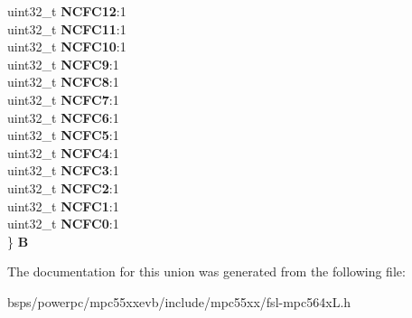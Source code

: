 \begin{DoxyCompactItemize}
\begin{tabbing}
\>uint32\_t {\bfseries NCFC12}:1\\
\>uint32\_t {\bfseries NCFC11}:1\\
\>uint32\_t {\bfseries NCFC10}:1\\
\>uint32\_t {\bfseries NCFC9}:1\\
\>uint32\_t {\bfseries NCFC8}:1\\
\>uint32\_t {\bfseries NCFC7}:1\\
\>uint32\_t {\bfseries NCFC6}:1\\
\>uint32\_t {\bfseries NCFC5}:1\\
\>uint32\_t {\bfseries NCFC4}:1\\
\>uint32\_t {\bfseries NCFC3}:1\\
\>uint32\_t {\bfseries NCFC2}:1\\
\>uint32\_t {\bfseries NCFC1}:1\\
\>uint32\_t {\bfseries NCFC0}:1\\
\} {\bfseries B}\\

\end{tabbing}\end{DoxyCompactItemize}


The documentation for this union was generated from the following file\+:\begin{DoxyCompactItemize}
\item 
bsps/powerpc/mpc55xxevb/include/mpc55xx/fsl-\/mpc564x\+L.\+h\end{DoxyCompactItemize}
